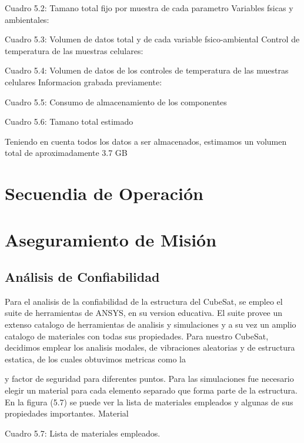     Cuadro 5.2: Tamano total fijo por muestra de cada parametro
     Variables fsicas y ambientales:

    Cuadro 5.3: Volumen de datos total y de cada variable fsico-ambiental
     Control de temperatura de las muestras celulares:

    Cuadro 5.4: Volumen de datos de los controles de temperatura de las muestras celulares
     Informacion grabada previamente:

    Cuadro 5.5: Consumo de almacenamiento de los componentes

    Cuadro 5.6: Tamano total estimado

    Teniendo en cuenta todos los datos a ser almacenados, estimamos un volumen total de
    aproximadamente 3.7 GB

\section{Secuendia de Operación}

\section{Aseguramiento de Misión}

  \subsection{Análisis de Confiabilidad}
    Para el analisis de la confiabilidad de la estructura del CubeSat, se empleo el suite de
    herramientas de ANSYS, en su version educativa. El suite provee un extenso catalogo de
    herramientas de analisis y simulaciones y a su vez un amplio catalogo de materiales con
    todas sus propiedades. Para nuestro CubeSat, decidimos emplear los analisis modales, de
    vibraciones aleatorias y de estructura estatica, de los cuales obtuvimos metricas como la

    y factor de seguridad para diferentes puntos.
    Para las simulaciones fue necesario elegir un material para cada elemento separado que
    forma parte de la estructura. En la figura (5.7) se puede ver la lista de materiales empleados
    y algunas de sus propiedades importantes.
    Material

    Cuadro 5.7: Lista de materiales empleados.

